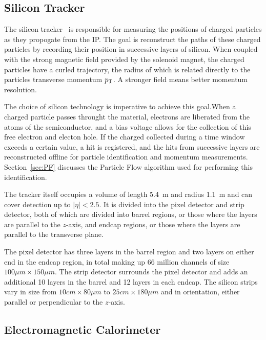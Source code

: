 \subsection{Silicon Tracker\label{subsec:tracker}}

The silicon tracker~\cite{Karimäki:368412} is responsible for measuring the positions of charged particles as they propogate from the IP.
The goal is reconstruct the paths of these charged particles by recording their position
in successive layers of silicon. When coupled with the strong magnetic field provided by the solenoid
magnet, the charged particles have a curled trajectory, the radius of which is related directly
to the particles transverse momentum $p_{\rm T}$. A stronger field means better momentum resolution.

The choice of silicon technology is imperative to achieve this goal.When a charged particle passes throught the material, electrons are liberated from the atoms of the semiconductor, and a bias voltage
allows for the collection of this free electron and electon hole. If the charged collected during
a time window exceeds a certain value, a hit is registered, and the hits from successive layers
are reconstructed offline for particle identification and momentum measurements.
Section~\ref{sec:PF} discusses the Particle Flow algorithm used for performing this identification.

The tracker itself occupies a volume
of length 5.4~m and radius 1.1~m and can cover detection up to $|\eta| < 2.5$. It is divided into
the pixel detector and strip detector, both of which are divided into barrel regions, or those
where the layers are parallel to the $z$-axis, and endcap regions, or those where the layers
are parallel to the transverse plane.

The pixel detector has three layers in the barrel region
and two layers on either end in the endcap region, in total making up 66 million channels of size
$100 \mu m \times 150 \mu m$. The strip detector surrounds the pixel detector and adds an additional
10 layers in the barrel and 12 layers in each endcap. The silicon strips vary in size from
$10 cm \times 80 \mu m$ to $25 cm \times 180 \mu m$ and in orientation, either parallel or perpendicular
to the $z$-axis.

\subsection{Electromagnetic Calorimeter\label{subsec:ecal}}

